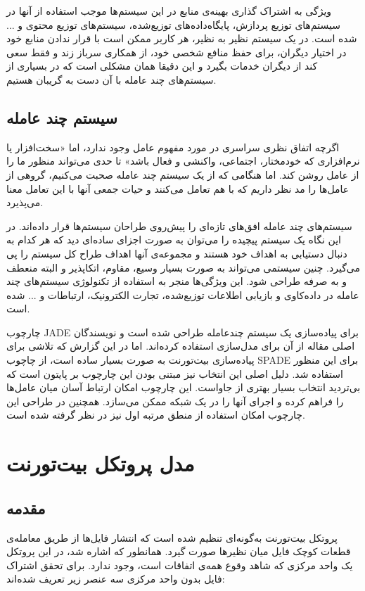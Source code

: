 \documentclass{article}
\begin{document}
ویژگی به اشتراک گذاری بهینه‌ی منابع در این سیستم‌ها موجب استفاده از آنها در سیستم‌های توزیع پردازش، پایگاه‌داده‌های توزیع‌شده، سیستم‌های توزیع محتوی و ... شده است. در یک سیستم نظیر به نظیر، هر کاربر ممکن است با قرار ندادن منابع خود در اختیار دیگران، برای حفظ منافع شخصی خود، از همکاری سرباز زند و فقط سعی کند از دیگران خدمات بگیرد و این دقیقا همان مشکلی است که در بسیاری از سیستم‌های چند عامله با آن دست به گریبان هستیم.  

\subsection{سیستم چند عامله}
اگرچه اتفاق نظری سراسری در مورد مفهوم عامل وجود ندارد، اما «سخت‌افزار یا نرم‌افزاری که خودمختار، اجتماعی، واکنشی و فعال باشد»\cite{wooldridge} تا حدی می‌تواند منظور ما را از عامل روشن کند. اما هنگامی که از یک سیستم چند عامله صحبت می‌کنیم، گروهی از عامل‌ها را مد نظر داریم که با هم تعامل می‌کنند و حیات جمعی آنها با این تعامل معنا می‌پذیرد.

سیستم‌های چند عامله افق‌های تازه‌ای را پیش‌روی طراحان سیستم‌ها قرار داده‌اند. در این نگاه یک سیستم پیچیده را می‌توان به صورت اجزای ساده‌ای دید که هر کدام به دنبال دستیابی به اهداف خود هستند و مجموعه‌ی آنها اهداف طراح کل سیستم را پی می‌گیرد. چنین سیستمی می‌تواند به صورت بسیار وسیع، مقاوم، اتکاپذیر و البته منعطف و به صرفه طراحی شود. این ویژگی‌ها منجر به استفاده از تکنولوژی سیستم‌های چند عامله در داده‌کاوی و بازیابی اطلاعات توزیع‌شده، تجارت الکترونیک، ارتباطات و ... شده است.

چارچوب JADE برای پیاده‌سازی یک سیستم چندعامله طراحی شده است و نویسندگان اصلی مقاله از آن برای مدل‌سازی استفاده کرده‌اند. اما در این گزارش که تلاشی برای پیاده‌سازی بیت‌تورنت به صورت بسیار ساده است، از چاچوب SPADE\cite{spade} برای این منظور استفاده شد. دلیل اصلی این انتخاب نیز مبتنی بودن این چارچوب بر پایتون است که بی‌تردید انتخاب بسیار بهتری از جاواست. این چارچوب امکان ارتباط آسان میان عامل‌ها را فراهم کرده و اجرای آنها را در یک شبکه ممکن می‌سازد. همچنین در طراحی این چارچوب امکان استفاده از منطق مرتبه اول نیز در نظر گرفته شده است. 

\section{مدل پروتکل بیت‌تورنت}

\subsection{مقدمه}
پروتکل بیت‌تورنت به‌گونه‌ای تنظیم شده است که انتشار فایل‌ها از طریق معامله‌ی قطعات کوچک فایل میان نظیرها صورت گیرد. همانطور که اشاره شد، در این پروتکل یک واحد مرکزی که شاهد وقوع همه‌ی اتفاقات است، وجود ندارد. برای تحقق اشتراک فایل بدون واحد مرکزی سه عنصر زیر تعریف شده‌اند:
\end{document}
